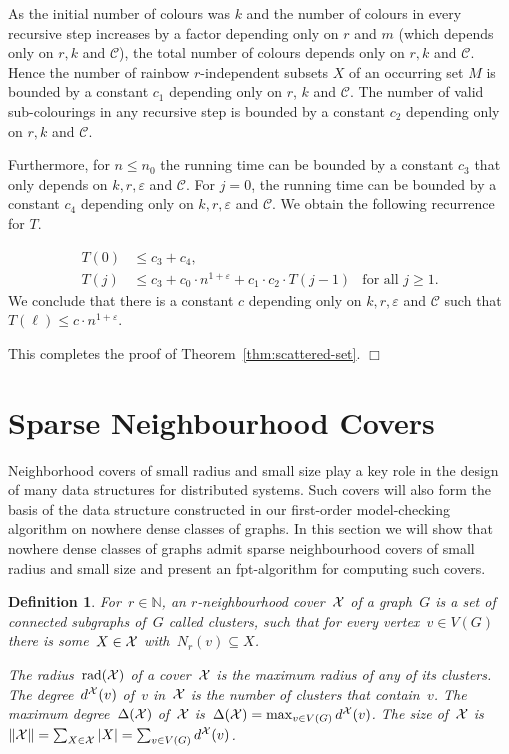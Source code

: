 \documentclass[11pt]{article}
\newtheorem{definition}[theorem]{Definition}
\numberwithin{equation}{section}
\newcommand{\N}{{\mathbb N}} \newcommand{\Q}{{\mathbb Q}}
\newcommand{\CCC}{\mathcal{C}} \newcommand{\DDD}{\mathcal{D}}
\newcommand{\norm}[1]{\ensuremath{\left\lVert#1\right\rVert}}
\newcommand{\rad}{\mathrm{rad}}
\renewcommand{\epsilon}{\varepsilon}
\def\qed{\hspace*{\fill}$\Box$}
\begin{document}
  As the initial number of colours was $k$ and the number of colours
  in every recursive step increases by a factor depending only on $r$
  and $m$ (which depends only on $r,k$ and $\CCC$), the total number
  of colours depends only on $r, k$ and $\CCC$. Hence the number of
  rainbow $r$-independent subsets $X$ of an occurring set $M$ is
  bounded by a constant $c_1$ depending only on $r$, $k$ and
  $\CCC$. The number of valid sub-colourings in any recursive step is
  bounded by a constant $c_2$ depending only on $r, k$ and
  $\CCC$.

  Furthermore, for $n\leq n_0$ the running time can be bounded by a
  constant $c_3$ that only depends on $k,r, \epsilon$ and $\CCC$. For
  $j=0$, the running time can be bounded by a constant $c_4$ depending
  only on $k, r, \epsilon$ and $\CCC$. We obtain the following
  recurrence for $T$. 

  \begin{align*}
    T(0)&\le c_3+c_4,\\
    T({j})&\le c_3+c_0\cdot n^{1+\epsilon} + c_1\cdot c_2\cdot T(j-1) &\text{for
      all }{j}\ge 1.
  \end{align*}
  We conclude that there is a constant $c$ depending only on $k, r,
  \epsilon$ and $\CCC$ such that $T(\ell)\leq c\cdot n^{1+\epsilon}$.

This completes the proof of Theorem~\ref{thm:scattered-set}.
\qed





\section{Sparse Neighbourhood Covers}
\label{sec:covers}

Neighborhood covers of small radius and small size play a key role in
the design of many data structures for distributed systems.  Such
covers will also form the basis of the data structure constructed in
our first-order model-checking algorithm on nowhere dense classes of
graphs. In this section we will show that nowhere dense classes of
graphs admit sparse neighbourhood covers of small radius and small
size and present an fpt-algorithm for computing such covers.

\begin{definition}
  For~$r\in\N$, an \emph{$r$-neighbourhood cover}~$\mathcal{X}$ of a
  graph~$G$ is a set of connected subgraphs of~$G$ called
  \emph{clusters}, such that for every vertex~$v\in V(G)$ there is
  some~$X\in\mathcal{X}$ with~$N_r(v)\subseteq X$. 

  The
  \emph{radius}~$\rad(\XXX)$ of a cover~$\mathcal{X}$ is the maximum radius
  of any of its clusters. The \emph{degree}~$d^{\mathcal{X}}(v)$ of~$v$
  in~$\mathcal{X}$ is the number of clusters that contain~$v$. The
  \emph{maximum degree}~$\Delta(\mathcal{X})$ of~$\mathcal{X}$
  is~$\Delta(\mathcal{X})=\max_{v\in V(G)} d^{\mathcal{X}}(v)$.  The size of~$\mathcal{X}$
  is~$\norm{\XXX}=\sum_{X\in\XXX}|X|=\sum_{v\in V(G)}d^\XXX(v)$.
\end{definition}
\end{document}

